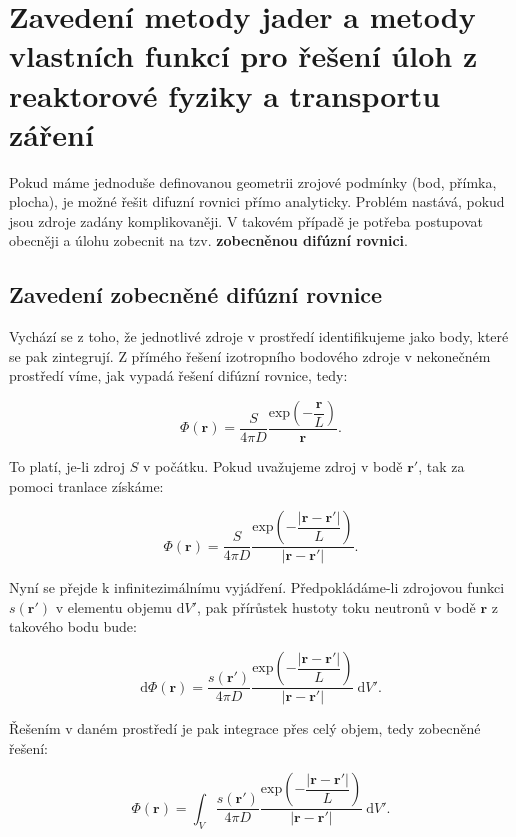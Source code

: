 \section[Metody jader a vlastních funkcí]{Zavedení metody jader a metody vlastních funkcí pro řešení úloh z reaktorové fyziky a transportu záření}

Pokud máme jednoduše definovanou geometrii zrojové podmínky (bod, přímka, plocha), je možné řešit difuzní rovnici přímo analyticky. Problém nastává, pokud jsou zdroje zadány komplikovaněji. V takovém případě je potřeba postupovat obecněji a úlohu zobecnit na tzv. \textbf{zobecněnou difúzní rovnici}.

\subsection{Zavedení zobecněné difúzní rovnice}

Vychází se z toho, že jednotlivé zdroje v prostředí identifikujeme jako body, které se pak zintegrují. Z přímého řešení izotropního bodového zdroje v nekonečném prostředí víme, jak vypadá řešení difúzní rovnice, tedy:

$$ \Phi(\textbf{r}) = \dfrac{S}{4 \pi D} \dfrac{\text{exp} \left(- \dfrac{\textbf{r}}{L}\right)}{\textbf{r}}. $$

To platí, je-li zdroj $S$ v počátku. Pokud uvažujeme zdroj v bodě $\textbf{r}'$, tak za pomoci tranlace získáme:

$$ \Phi(\textbf{r}) = \dfrac{S}{4 \pi D} \dfrac{\text{exp} \left(- \dfrac{|\textbf{r}-\textbf{r}'|}{L}\right)}{|\textbf{r}-\textbf{r}'|}. $$

Nyní se přejde k infinitezimálnímu vyjádření. Předpokládáme-li zdrojovou funkci $s(\textbf{r}')$ v elementu objemu $\text{d}V'$, pak přírůstek hustoty toku neutronů v bodě $\textbf{r}$ z takového bodu bude:

$$ \text{d}\Phi(\textbf{r}) = \dfrac{s(\textbf{r}')}{4 \pi D} \dfrac{\text{exp} \left(- \dfrac{|\textbf{r}-\textbf{r}'|}{L}\right)}{|\textbf{r}-\textbf{r}'|} \: \text{d}V'. $$

Řešením v daném prostředí je pak integrace přes celý objem, tedy zobecněné řešení:

\begin{equation}
    \Phi(\textbf{r}) = \int_V \dfrac{s(\textbf{r}')}{4 \pi D} \dfrac{\text{exp} \left(- \dfrac{|\textbf{r}-\textbf{r}'|}{L}\right)}{|\textbf{r}-\textbf{r}'|} \: \text{d}V'.
\end{equation}

